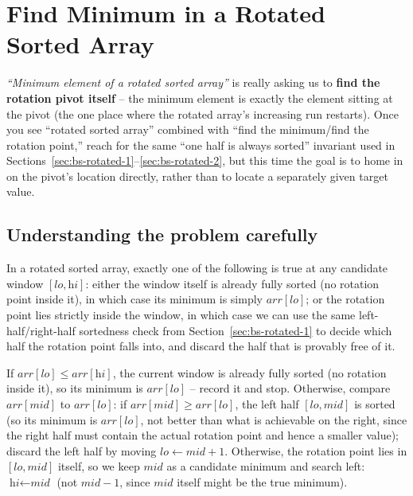 \section{Find Minimum in a Rotated Sorted Array}
\label{sec:bs-find-min-rotated}


\begin{patternbox}
\emph{``Minimum element of a rotated sorted array''} is really asking us to
\textbf{find the rotation pivot itself} -- the minimum element is exactly
the element sitting at the pivot (the one place where the rotated array's
increasing run restarts). Once you see ``rotated sorted array'' combined
with ``find the minimum/find the rotation point,'' reach for the same
``one half is always sorted'' invariant used in
Sections~\ref{sec:bs-rotated-1}--\ref{sec:bs-rotated-2}, but this time the
goal is to home in on the pivot's location directly, rather than to locate
a separately given target value.
\end{patternbox}

\subsection*{Understanding the problem carefully}

In a rotated sorted array, exactly one of the following is true at any
candidate window $[\textit{lo}, \textit{hi}]$: either the window itself is
already fully sorted (no rotation point inside it), in which case its
minimum is simply $\textit{arr}[\textit{lo}]$; or the rotation point lies
strictly inside the window, in which case we can use the same
left-half/right-half sortedness check from Section~\ref{sec:bs-rotated-1}
to decide which half the rotation point falls into, and discard the half
that is provably free of it.

\begin{ideabox}
If $\textit{arr}[\textit{lo}] \le \textit{arr}[\textit{hi}]$, the current
window is already fully sorted (no rotation inside it), so its minimum is
$\textit{arr}[\textit{lo}]$ -- record it and stop. Otherwise, compare
$\textit{arr}[\textit{mid}]$ to $\textit{arr}[\textit{lo}]$: if
$\textit{arr}[\textit{mid}] \ge \textit{arr}[\textit{lo}]$, the left half
$[\textit{lo}, \textit{mid}]$ is sorted (so its minimum is
$\textit{arr}[\textit{lo}]$, not better than what is achievable on the
right, since the right half must contain the actual rotation point and
hence a smaller value); discard the left half by moving $\textit{lo}
\gets \textit{mid}+1$. Otherwise, the rotation point lies in
$[\textit{lo}, \textit{mid}]$ itself, so we keep $\textit{mid}$ as a
candidate minimum and search left: $\textit{hi} \gets \textit{mid}$ (not
$\textit{mid}-1$, since $\textit{mid}$ itself might be the true minimum).
\end{ideabox}

